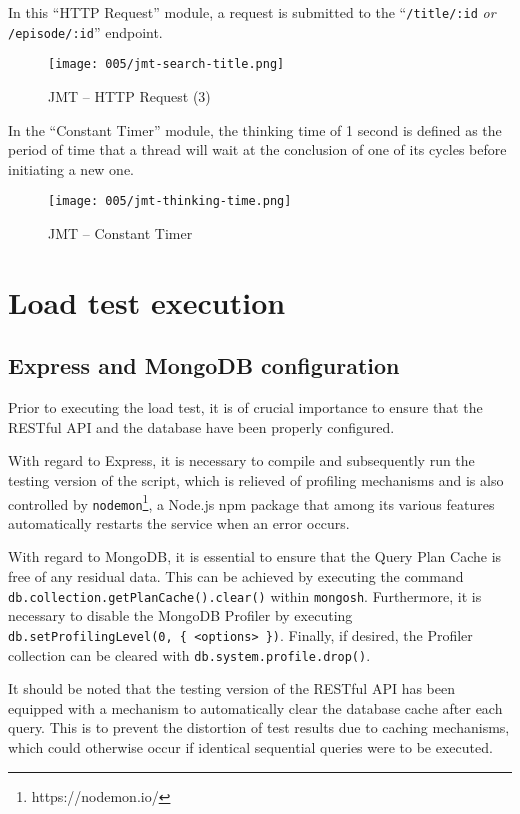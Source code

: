 In this ``HTTP Request'' module, a request is submitted to the ``\verb|/title/:id| \textit{or} \verb|/episode/:id|'' endpoint.
\begin{figure}[h]
	\centering
	\texttt{[image: 005/jmt-search-title.png]}
	\caption{JMT -- HTTP Request (3)}
\end{figure}

\clearpage

In the ``Constant Timer'' module, the thinking time of 1 second is defined as the period of time that a thread will wait at the conclusion of one of its cycles before initiating a new one.
\begin{figure}[h]
	\centering
	\texttt{[image: 005/jmt-thinking-time.png]}
	\caption{JMT -- Constant Timer}
\end{figure}

\section{Load test execution}

\subsection{Express and MongoDB configuration}

Prior to executing the load test, it is of crucial importance to ensure that the RESTful API and the database have been properly configured.

With regard to Express, it is necessary to compile and subsequently run the testing version of the script, which is relieved of profiling mechanisms and is also controlled by \verb|nodemon|\footnote[1]{https://nodemon.io/}, a Node.js npm package that among its various features automatically restarts the service when an error occurs.

With regard to MongoDB, it is essential to ensure that the Query Plan Cache is free of any residual data.
This can be achieved by executing the command \verb|db.collection.getP|\newline\verb|lanCache().clear()| within \verb|mongosh|.
Furthermore, it is necessary to disable the MongoDB Profiler by executing \verb|db.setProfilingLevel(0, { <options> })|.
Finally, if desired, the Profiler collection can be cleared with \verb|db.system.profile.drop()|.

It should be noted that the testing version of the RESTful API has been equipped with a mechanism to automatically clear the database cache after each query.
This is to prevent the distortion of test results due to caching mechanisms, which could otherwise occur if identical sequential queries were to be executed.


